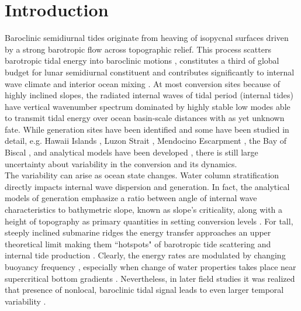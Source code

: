 \documentclass[12pt]{article}
\begin{document}
\section{Introduction}
Baroclinic semidiurnal tides originate from heaving of isopycnal surfaces driven by a strong 
barotropic flow across topographic relief. This process scatters barotropic tidal 
energy into baroclinic motions \citep{hendershott1981long}, constitutes a 
third of global budget for lunar semidiurnal constituent \citep{egbert2000significant, 
munk1997once} and contributes significantly to internal wave climate \citep{wunsch1975deep} and 
interior ocean mixing \citep{wunsch2004vertical}. At most conversion sites because of highly 
inclined slopes, the radiated 
internal waves of tidal period (internal tides) have vertical wavenumber spectrum dominated by 
highly stable low modes \citep{st2002role} able to transmit tidal energy over ocean basin-scale 
distances \citep{zhao2016global} with as yet unknown fate. While generation sites have been 
identified 
\citep{morozov1995semidiurnal, simmons2004internal, arbic2010concurrent} and some have been 
studied in detail, e.g. Hawaii Islands \citep{rudnick2003tides}, Luzon Strait 
\citep{alford2015formation}, Mendocino Escarpment \citep{althaus2003internal}, 
the Bay of Biscal 
\citep{gerkema2004internal}, and analytical models have been developed \citep{garrett2007internal}, 
there is still large uncertainty about variability in the conversion and its dynamics.\\

The variability can arise as ocean state changes. Water column stratification directly 
impacts internal wave dispersion and generation. In fact, the analytical models of generation 
emphasize a ratio between angle of internal wave characteristics to bathymetric slope, known  
as slope's criticality, \citep{sutherland2010internal, garrett2007internal} along with a height of 
topography as primary 
quantities in setting conversion levels \citep{llewellyn2003tidal, petrelis2006tidal}. For tall, 
steeply inclined submarine ridges the energy transfer approaches an upper theoretical limit 
\citep{petrelis2006tidal, st2003generation} making them ``hotspots" of barotropic tide 
scattering and internal tide production \citep{morozov1995semidiurnal, egbert2000significant}. 
Clearly, the energy rates are modulated by changing buoyancy frequency 
\citep{holloway1999internal}, especially when change of water properties takes place near 
supercritical bottom gradients \citep{gerkema2004internal}. Nevertheless, in later field 
studies it was realized that presence of nonlocal, baroclinic tidal signal leads to even larger 
temporal variability \citep{Kelly2010a, zilberman2011incoherent, pickering2015structure}.\\
\end{document}
